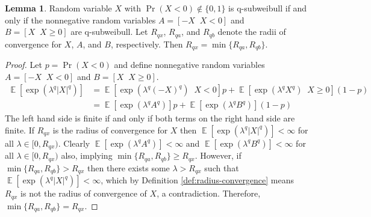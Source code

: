 \documentclass{article}
\theoremstyle{definition}
\newtheorem{lemma}{Lemma}[theorem]
\DeclareMathOperator{\E}{\mathbb{E}}
\DeclareMathOperator{\given}{\left.\right|}
\begin{document}
\begin{lemma}
\label{lem:subweibull-split}
Random variable $X$ with $\Pr(X<0)\notin \{0,1\}$ is q-subweibull if and only if the nonnegative random variables $A = [-X\given X<0]$ and $B = [X\given X\geq 0]$ are q-subweibull. Let $R_{qx}$, $R_{qa}$, and $R_{qb}$ denote the radii of convergence for $X$, $A$, and $B$, respectively. Then $R_{qx}=\min\{R_{qa},R_{qb}\}$.
\end{lemma}
\begin{proof}
Let $p=\Pr(X<0)$ and define nonnegative random variables $A = [-X\given X<0]$ and $B = [X\given X\geq 0]$.
\begin{align*}
\E[\exp(\lambda^q\vert X\vert^q)] &= \E[\exp(\lambda^q (-X)^q)\given X<0]p + \E[\exp(\lambda^q X^q)\given X\geq 0](1-p)\\
&= \E[\exp(\lambda^q A^q)]p + \E[\exp(\lambda^q B^q)](1-p)
\end{align*}
The left hand side is finite if and only if both terms on the right hand side are finite. If $R_{qx}$ is the radius of convergence for $X$ then $\E[\exp(\lambda^q \vert X\vert^q)]<\infty$ for all $\lambda\in [0,R_{qx})$. Clearly $\E[\exp(\lambda^q A^q)]<\infty$ and $\E[\exp(\lambda^q B^q)]<\infty$ for all $\lambda\in [0,R_{qx})$ also, implying $\min\{R_{qa},R_{qb}\}\geq R_{qx}$. However, if $\min\{R_{qa},R_{qb}\}>R_{qx}$ then there exists some $\lambda> R_{qx}$ such that $\E[\exp(\lambda^q \vert X\vert^q)]<\infty$, which by Definition \ref{def:radius-convergence} means $R_{qx}$ is not the radius of convergence of $X$, a contradiction. Therefore, $\min\{R_{qa},R_{qb}\}=R_{qx}$. 
\end{proof}
\end{document}

